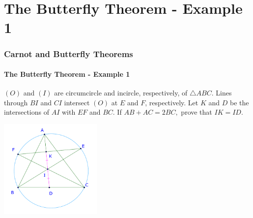 \documentclass[8pt,xcolor=table,dvipsnames]{beamer}
\begin{document}
\section{The Butterfly Theorem - Example 1}

\begin{frame}[t]
    \frametitle{Carnot and Butterfly Theorems}
    \framesubtitle{The Butterfly Theorem - Example 1}
    \begin{example}
        $(O)$ and $(I)$ are circumcircle and incircle, respectively, of $\triangle ABC.$
        Lines through $BI$ and $CI$ intersect $(O)$ at $E$ and $F$, respectively.
        Let $K$ and $D$ be the intersections of $AI$ with $EF$ and $BC.$
        If $AB + AC = 2BC,$ prove that $IK = ID.$
    \end{example}

    \bigbreak
    \begin{center}
        \includegraphics[width=5cm]{./svg/pdf/24-25-s2-g3-p5.pdf}
    \end{center}
\end{frame}
\end{document}
